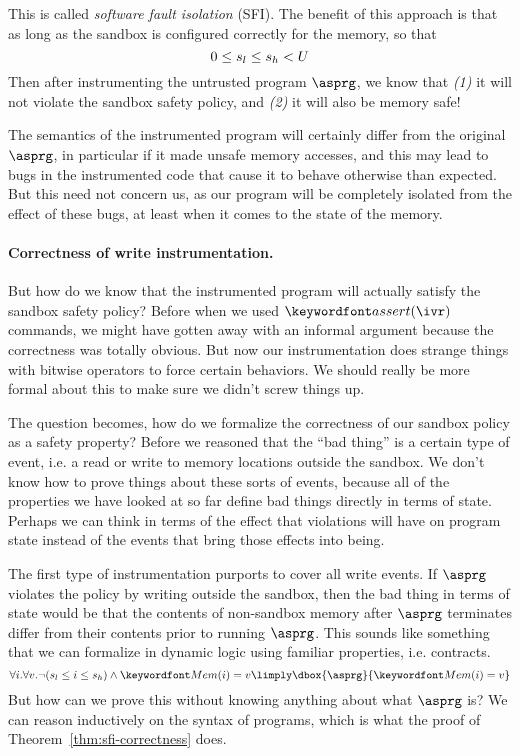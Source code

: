 \documentclass[11pt,twoside]{scrartcl}
\begin{document}
This is called \emph{software fault isolation} (SFI).
The benefit of this approach is that as long as the sandbox is configured correctly for the memory, so that
\begin{equation}
0 \le s_l \le s_h < U
\end{equation}
Then after instrumenting the untrusted program $\asprg$, we know that \emph{(1)} it will not violate the sandbox safety policy, and \emph{(2)} it will also be memory safe! 

The semantics of the instrumented program will certainly differ from the original $\asprg$, in particular if it made unsafe memory accesses, and this may lead to bugs in the instrumented code that cause it to behave otherwise than expected. But this need not concern us, as our program will be completely isolated from the effect of these bugs, at least when it comes to the state of the memory.

\paragraph{Correctness of write instrumentation.} But how do we know that the instrumented program will actually satisfy the sandbox safety policy? Before when we used $\passert{\ivr}$ commands, we might have gotten away with an informal argument because the correctness was totally obvious. But now our instrumentation does strange things with bitwise operators to force certain behaviors. We should really be more formal about this to make sure we didn't screw things up.

The question becomes, how do we formalize the correctness of our sandbox policy as a safety property? Before we reasoned that the ``bad thing'' is a certain type of event, i.e. a read or write to memory locations outside the sandbox. We don't know how to prove things about these sorts of events, because all of the properties we have looked at so far define bad things  directly in terms of state. Perhaps we can think in terms of the effect that violations will have on program state instead of the events that bring those effects into being.

The first type of instrumentation purports to cover all write events. If $\asprg$ violates the policy by writing outside the sandbox, then the bad thing in terms of state would be that the contents of non-sandbox memory after $\asprg$ terminates differ from their contents prior to running $\asprg$. This sounds like something that we can formalize in dynamic logic using familiar properties, i.e. contracts.
\begin{equation}
\label{eq:sfi-integrity}
\forall i . \forall v . \lnot(s_l \le i \le s_h)  \land \pderef{i}=v \limply \dbox{\asprg}{\pderef{i}=v}
\end{equation}
But how can we prove this without knowing anything about what $\asprg$ is? We can reason inductively on the syntax of programs, which is what the proof of Theorem~\ref{thm:sfi-correctness} does.
\end{document}
